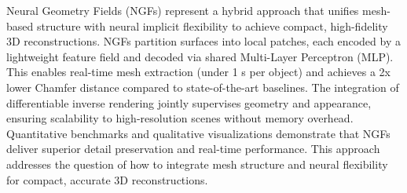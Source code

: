 Neural Geometry Fields (NGFs) represent a hybrid approach that unifies mesh-based structure with neural implicit flexibility to achieve compact, high-fidelity 3D reconstructions.  
NGFs partition surfaces into local patches, each encoded by a lightweight feature field and decoded via shared Multi-Layer Perceptron (MLP).  
This enables real-time mesh extraction (under 1 s per object) and achieves a 2x lower Chamfer distance compared to state-of-the-art baselines.  
The integration of differentiable inverse rendering jointly supervises geometry and appearance, ensuring scalability to high-resolution scenes without memory overhead.  
Quantitative benchmarks and qualitative visualizations demonstrate that NGFs deliver superior detail preservation and real-time performance.  
This approach addresses the question of how to integrate mesh structure and neural flexibility for compact, accurate 3D reconstructions.  
